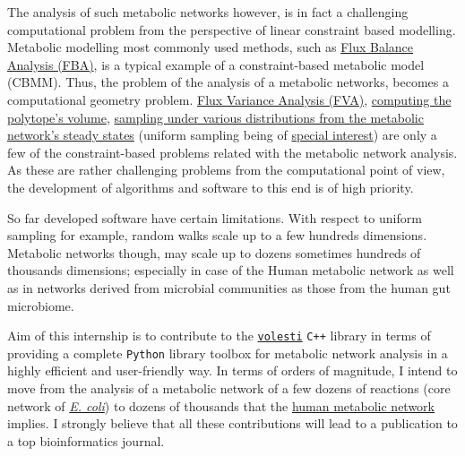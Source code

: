 \documentclass[a4paper, 12pt]{article}
\begin{document}
The analysis of such metabolic networks however, is in fact a challenging computational problem from the perspective of linear constraint based modelling. Metabolic modelling most commonly used methods, such as \textcolor{blue}{\href{https://www.nature.com/articles/nbt.1614}{Flux Balance Analysis (FBA)}}, is a typical example of a constraint-based metabolic model (CBMM). Thus, the problem of the analysis of a metabolic networks, becomes a computational geometry problem. \textcolor{blue}{\href{https://www.nature.com/articles/s41540-019-0109-0}{Flux Variance Analysis (FVA)}}, \textcolor{blue}{\href{https://dl.acm.org/doi/fullHtml/10.1145/3194656}{computing the polytope's volume}}, 
\textcolor{blue}{\href{https://journals.plos.org/plosone/article?id=10.1371/journal.pone.0235393}{sampling under various distributions from the metabolic network's steady states}} (uniform sampling being of \textcolor{blue}{\href{https://academic.oup.com/bioinformatics/article/33/11/1741/2964731}{special interest}}) are only a few of the constraint-based problems related with the metabolic network analysis. As these are rather challenging problems from the computational point of view, the development of algorithms and software to this end is of high priority.

So far developed software have certain limitations. With respect to uniform sampling for example, random walks scale up to a few hundreds dimensions.  Metabolic networks though, may scale up to dozens sometimes hundreds of thousands dimensions; especially in case of the Human metabolic network as well as in networks derived from microbial communities as those from the human gut microbiome.

Aim of this internship is to contribute to the \textcolor{blue}{\href{https://github.com/GeomScale/volume_approximation}{{\tt volesti}}} \texttt{C++} library in terms of providing a complete \texttt{Python} library toolbox for metabolic network analysis in a highly efficient and user-friendly way. In terms of orders of magnitude, I intend to move from the analysis of a metabolic network of a few dozens of reactions (core network of \textcolor{blue}{\href{http://bigg.ucsd.edu/models/e_coli_core}{\textit{E. coli}}}) to dozens of thousands that the \textcolor{blue}{\href{http://bigg.ucsd.edu/models/Recon3D}{human metabolic network}} implies. I strongly believe that all these contributions will lead to a publication to a top bioinformatics journal. 
\end{document}
